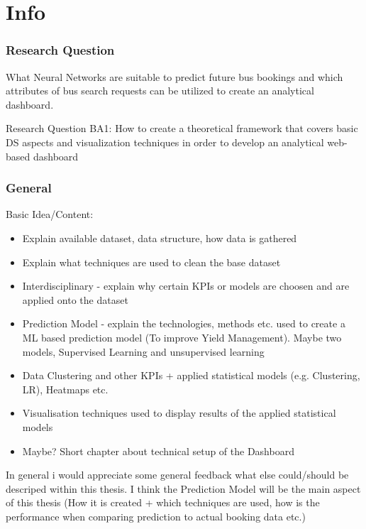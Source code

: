 %
%
% 
% 
% 

\chapter{Info}
\label{chap:info}

\subsection{Research Question}
What Neural Networks are suitable to predict future bus bookings and which attributes of bus search requests can be utilized to create an analytical dashboard.


Research Question BA1: How to create a theoretical framework that covers basic DS
aspects and visualization techniques in order to develop an analytical web-based dashboard



\subsection{General}
Basic Idea/Content: \newline

\begin{itemize}
  \item Explain available dataset, data structure, how data is gathered 
  \item Explain what techniques are used to clean the base dataset
  \item Interdisciplinary - explain why certain KPIs or models are choosen and are applied onto the dataset 
  \item Prediction Model - explain the technologies, methods etc. used to create a ML based prediction model (To improve Yield Management). Maybe two models, Supervised Learning and unsupervised learning 
  \item Data Clustering and other KPIs + applied statistical models (e.g. Clustering, LR), Heatmaps etc. 
  \item Visualisation techniques used to display results of the applied statistical models 
  \item Maybe? Short chapter about technical setup of the Dashboard   
\end{itemize}
In general i would appreciate some general feedback what else could/should be descriped within this thesis. I think the Prediction Model will be the main aspect of this thesis (How it is created + which techniques are used, how is the performance when comparing prediction to actual booking data etc.) 




